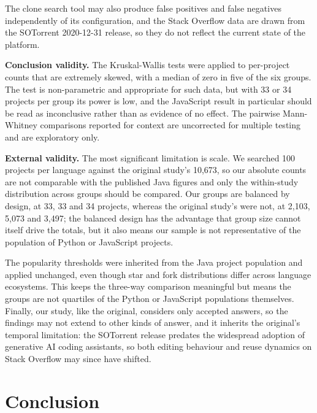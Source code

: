 \documentclass[onecolumn,11pt]{IEEEtran}
\begin{document}
The clone search tool may also produce false positives and false negatives independently of its configuration, and the Stack Overflow data are drawn from the SOTorrent 2020-12-31 release, so they do not reflect the current state of the platform.

\textbf{Conclusion validity.}
The Kruskal-Wallis tests were applied to per-project counts that are extremely skewed, with a median of zero in five of the six groups.
The test is non-parametric and appropriate for such data, but with 33 or 34 projects per group its power is low, and the JavaScript result in particular should be read as inconclusive rather than as evidence of no effect.
The pairwise Mann-Whitney comparisons reported for context are uncorrected for multiple testing and are exploratory only.

\textbf{External validity.}
The most significant limitation is scale.
We searched 100 projects per language against the original study's 10{,}673, so our absolute counts are not comparable with the published Java figures and only the within-study distribution across groups should be compared.
Our groups are balanced by design, at 33, 33 and 34 projects, whereas the original study's were not, at 2{,}103, 5{,}073 and 3{,}497; the balanced design has the advantage that group size cannot itself drive the totals, but it also means our sample is not representative of the population of Python or JavaScript projects.

The popularity thresholds were inherited from the Java project population and applied unchanged, even though star and fork distributions differ across language ecosystems.
This keeps the three-way comparison meaningful but means the groups are not quartiles of the Python or JavaScript populations themselves.
Finally, our study, like the original, considers only accepted answers, so the findings may not extend to other kinds of answer, and it inherits the original's temporal limitation: the SOTorrent release predates the widespread adoption of generative AI coding assistants, so both editing behaviour and reuse dynamics on Stack Overflow may since have shifted.

\section{Conclusion}
\end{document}
